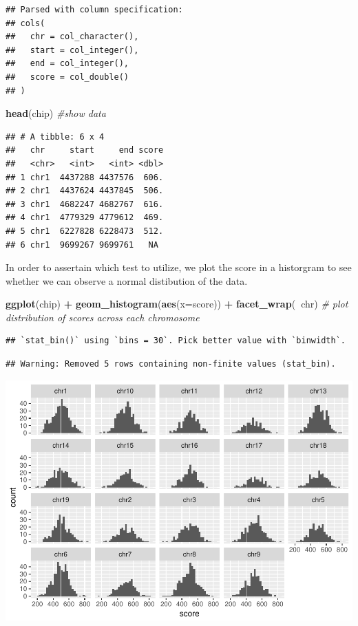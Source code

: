 \documentclass[]{article}
\newenvironment{Shaded}{\begin{snugshade}}{\end{snugshade}}
\newcommand{\KeywordTok}[1]{\textcolor[rgb]{0.13,0.29,0.53}{\textbf{#1}}}
\newcommand{\DataTypeTok}[1]{\textcolor[rgb]{0.13,0.29,0.53}{#1}}
\newcommand{\StringTok}[1]{\textcolor[rgb]{0.31,0.60,0.02}{#1}}
\newcommand{\CommentTok}[1]{\textcolor[rgb]{0.56,0.35,0.01}{\textit{#1}}}
\newcommand{\OperatorTok}[1]{\textcolor[rgb]{0.81,0.36,0.00}{\textbf{#1}}}
\newcommand{\NormalTok}[1]{#1}
\begin{document}
\begin{verbatim}
## Parsed with column specification:
## cols(
##   chr = col_character(),
##   start = col_integer(),
##   end = col_integer(),
##   score = col_double()
## )
\end{verbatim}

\begin{Shaded}
\begin{Highlighting}[]
\KeywordTok{head}\NormalTok{(chip) }\CommentTok{#show data}
\end{Highlighting}
\end{Shaded}

\begin{verbatim}
## # A tibble: 6 x 4
##   chr     start     end score
##   <chr>   <int>   <int> <dbl>
## 1 chr1  4437288 4437576  606.
## 2 chr1  4437624 4437845  506.
## 3 chr1  4682247 4682767  616.
## 4 chr1  4779329 4779612  469.
## 5 chr1  6227828 6228473  512.
## 6 chr1  9699267 9699761   NA
\end{verbatim}

In order to assertain which test to utilize, we plot the score in a
historgram to see whether we can observe a normal distibution of the
data.

\begin{Shaded}
\begin{Highlighting}[]
\KeywordTok{ggplot}\NormalTok{(chip) }\OperatorTok{+}\StringTok{ }\KeywordTok{geom_histogram}\NormalTok{(}\KeywordTok{aes}\NormalTok{(}\DataTypeTok{x=}\NormalTok{score)) }\OperatorTok{+}\StringTok{ }\KeywordTok{facet_wrap}\NormalTok{(}\OperatorTok{~}\NormalTok{chr) }\CommentTok{# plot distribution of scores across each chromosome}
\end{Highlighting}
\end{Shaded}

\begin{verbatim}
## `stat_bin()` using `bins = 30`. Pick better value with `binwidth`.
\end{verbatim}

\begin{verbatim}
## Warning: Removed 5 rows containing non-finite values (stat_bin).
\end{verbatim}

\includegraphics{Hw1_without_solutions_files/figure-latex/unnamed-chunk-3-1.pdf}
\end{document}
